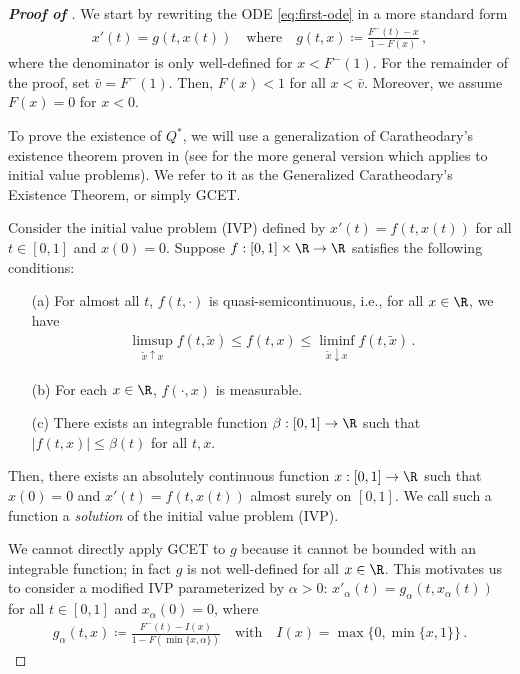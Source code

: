 \begin{proof}[\textbf{Proof of }]
	We start by rewriting the ODE \eqref{eq:first-ode} in a more standard form 
	\begin{align}\label{eq:first-ode-rewrite}
		x'(t) = g(t,x(t)) \quad \text{where}\quad g(t,x) \coloneqq \frac{F^-(t) - x}{1 - F(x)}\,,
	\end{align}
	where the denominator is only well-defined for $x < F^-(1)$. For the remainder of the proof, set $\bar v = F^-(1)$. Then, $F(x) < 1$ for all $x < \bar v$. Moreover, we assume $F(x) = 0$ for $x < 0$.
	
	To prove the existence of $Q^*$, we will use a generalization of Caratheodary's existence theorem proven in \citet{biles1997caratheodory} (see \citealt{biles2000solvability} for the more general version which applies to initial value problems). We refer to it as the Generalized Caratheodary's Existence Theorem, or simply GCET.
	\begin{theorem*}[GCET]
		Consider the initial value problem (IVP) defined by $x'(t) = f(t,x(t))$ for all $t\in [0,1]$ and $x(0) = 0$. Suppose $f:[0,1] \times \R \to \R$ satisfies the following conditions:
		\begin{itemize}
			\item[(a)] For almost all $t$, $f(t,\cdot)$ is quasi-semicontinuous, i.e., for all $x \in \R$, we have
						\begin{align*}
							\limsup_{\tilde x \uparrow x} f(t,\tilde x) \leq f(t,x) \leq \liminf_{\tilde x \downarrow x} f(t, \tilde x)\,.
						\end{align*}
			\item[(b)] For each $x \in \R$, $f(\cdot, x)$ is measurable.
			\item[(c)] There exists an integrable function $\beta:[0,1] \to \R$ such that $|f(t,x)| \leq \beta(t)$ for all $t,x$.
		\end{itemize}
		Then, there exists an absolutely continuous function $x:[0,1] \to \R$ such that $x(0) = 0$ and $x'(t) = f(t,x(t))$ almost surely on $[0,1]$. We call such a function a \emph{solution} of the initial value problem (IVP).
	\end{theorem*}
	
    We cannot directly apply GCET to $g$ because it cannot be bounded with an integrable function; in fact $g$ is not well-defined for all $x \in \R$. This motivates us to consider a modified IVP parameterized by $\alpha > 0$: $x'_\alpha(t) = g_\alpha(t, x_\alpha(t))$ for all $t \in [0,1]$ and $x_\alpha(0)= 0$, where
	\begin{align}\label{eq:IVP-alpha}
		g_\alpha(t,x) \coloneqq \frac{F^-(t) - I(x)}{1 - F(\min\{x, \alpha\})} \quad \text{with} \quad I(x) = \max\{0, \min\{x,1\}\} \,.
	\end{align}
	

\end{proof}
